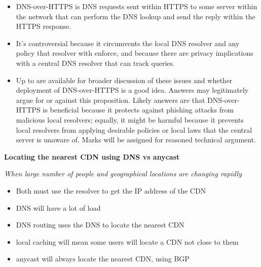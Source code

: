 \documentclass{article}
\begin{document}
\begin{itemize}
    \item DNS-over-HTTPS is DNS requests sent within HTTPS to some server within
    the network that can perform the DNS lookup and send the reply within the HTTPS
    response.
    \item It's controversial because it circumvents the local DNS resolver and any policy that
    resolver with enforce, and because there are privacy implications with a
    central DNS resolver that can track queries.
    \item Up to are available for broader discussion of these issues and whether
    deployment of DNS-over-HTTPS is a good idea. Answers may legitimately argue for
    or against this proposition. Likely answers are that DNS-over-HTTPS is beneficial
    because it protects against phishing attacks from malicious local resolvers; equally, it
    might be harmful because it prevents local resolvers from applying desirable policies or
    local laws that the central server is unaware of. Marks will be assigned for reasoned
    technical argument.
\end{itemize}

\textbf{Locating the nearest CDN using DNS vs anycast}

\textit{When large number of people and geographical locations are changing rapidly}
\begin{itemize}
    \item Both must use the resolver to get the IP address of the CDN
    \item DNS will have a lot of load
    \item DNS routing uses the DNS to locate the nearest CDN
    \item local caching will mean some users will locate a CDN not close to them
    \item anycast will always locate the nearest CDN, using BGP
\end{itemize}
\end{document}

